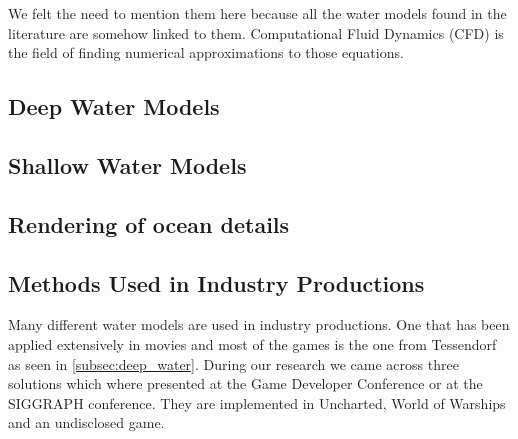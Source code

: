 We felt the need to mention them here because all the water models found in the
literature are somehow linked to them. Computational Fluid Dynamics (CFD) is the
field of finding numerical approximations to those equations. 

\subsection{Deep Water Models}\label{subsec:deep_water}



\subsection{Shallow Water Models}\label{subsec:shallow_water}


\subsection{Rendering of ocean details}

\subsection{Methods Used in Industry Productions}\label{subsec:methods_industry}


Many different water models are used in industry productions. One that has been
applied extensively in movies and most of the games is the one from Tessendorf
\autocite{tessendorf2001simulating} as seen in \autoref{subsec:deep_water}.
During our research we came across three solutions which where presented at the
Game Developer Conference or at the SIGGRAPH conference. They are implemented in
Uncharted, World of Warships and an undisclosed game.



